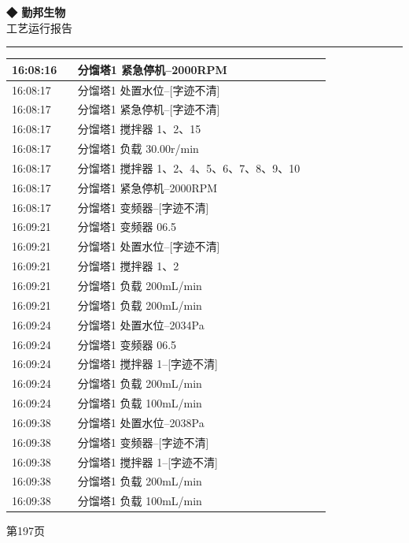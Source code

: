\documentclass[UTF8,10pt,a4paper,fontset=fandol]{ctexart}
\begin{document}
\noindent
\begin{minipage}[t]{0.47\linewidth}
\centering
\textbf{◆ 勤邦生物}\\[2pt]
工艺运行报告\\[-2pt]
\rule{\linewidth}{0.4pt}

\scriptsize
\begin{tabular}{|p{0.19\linewidth}|p{0.73\linewidth}|}
\hline
16:08:16 & 分馏塔1 紧急停机--2000RPM \\ \hline
16:08:17 & 分馏塔1 处置水位--[字迹不清] \\ \hline
16:08:17 & 分馏塔1 紧急停机--[字迹不清] \\ \hline
16:08:17 & 分馏塔1 搅拌器 1、2、15 \\ \hline
16:08:17 & 分馏塔1 负载 30.00r/min \\ \hline
16:08:17 & 分馏塔1 搅拌器 1、2、4、5、6、7、8、9、10 \\ \hline
16:08:17 & 分馏塔1 紧急停机--2000RPM \\ \hline
16:08:17 & 分馏塔1 变频器--[字迹不清] \\ \hline
16:09:21 & 分馏塔1 变频器 06.5 \\ \hline
16:09:21 & 分馏塔1 处置水位--[字迹不清] \\ \hline
16:09:21 & 分馏塔1 搅拌器 1、2 \\ \hline
16:09:21 & 分馏塔1 负载 200mL/min \\ \hline
16:09:21 & 分馏塔1 负载 200mL/min \\ \hline
16:09:24 & 分馏塔1 处置水位--2034Pa \\ \hline
16:09:24 & 分馏塔1 变频器 06.5 \\ \hline
16:09:24 & 分馏塔1 搅拌器 1--[字迹不清] \\ \hline
16:09:24 & 分馏塔1 负载 200mL/min \\ \hline
16:09:24 & 分馏塔1 负载 100mL/min \\ \hline
16:09:38 & 分馏塔1 处置水位--2038Pa \\ \hline
16:09:38 & 分馏塔1 变频器--[字迹不清] \\ \hline
16:09:38 & 分馏塔1 搅拌器 1--[字迹不清] \\ \hline
16:09:38 & 分馏塔1 负载 200mL/min \\ \hline
16:09:38 & 分馏塔1 负载 100mL/min \\ \hline
\end{tabular}

\vspace{2pt}
{\tiny 第197页}
\end{minipage}
\end{document}
